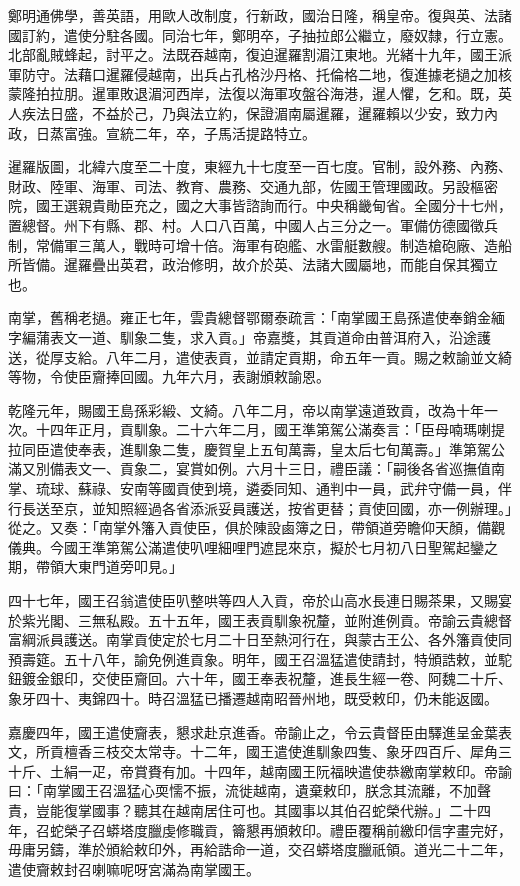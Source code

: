 \begin{pinyinscope}
鄭明通佛學，善英語，用歐人改制度，行新政，國治日隆，稱皇帝。復與英、法諸國訂約，遣使分駐各國。同治七年，鄭明卒，子抽拉郎公繼立，廢奴隸，行立憲。北部亂賊蜂起，討平之。法既吞越南，復迫暹羅割湄江東地。光緒十九年，國王派軍防守。法藉口暹羅侵越南，出兵占孔格沙丹格、托倫格二地，復進據老撾之加核蒙隆拍拉朋。暹軍敗退湄河西岸，法復以海軍攻盤谷海港，暹人懼，乞和。既，英人疾法日盛，不益於己，乃與法立約，保證湄南屬暹羅，暹羅賴以少安，致力內政，日蒸富強。宣統二年，卒，子馬活提路特立。

暹羅版圖，北緯六度至二十度，東經九十七度至一百七度。官制，設外務、內務、財政、陸軍、海軍、司法、教育、農務、交通九部，佐國王管理國政。另設樞密院，國王選親貴勛臣充之，國之大事皆諮詢而行。中央稱畿甸省。全國分十七州，置總督。州下有縣、郡、村。人口八百萬，中國人占三分之一。軍備仿德國徵兵制，常備軍三萬人，戰時可增十倍。海軍有砲艦、水雷艇數艘。制造槍砲廠、造船所皆備。暹羅疊出英君，政治修明，故介於英、法諸大國屬地，而能自保其獨立也。

南掌，舊稱老撾。雍正七年，雲貴總督鄂爾泰疏言：「南掌國王島孫遣使奉銷金緬字編蒲表文一道、馴象二隻，求入貢。」帝嘉獎，其貢道命由普洱府入，沿途護送，從厚支給。八年二月，遣使表貢，並請定貢期，命五年一貢。賜之敕諭並文綺等物，令使臣齎捧回國。九年六月，表謝頒敕諭恩。

乾隆元年，賜國王島孫彩緞、文綺。八年二月，帝以南掌遠道致貢，改為十年一次。十四年正月，貢馴象。二十六年二月，國王準第駕公滿奏言：「臣母喃瑪喇提拉同臣遣使奉表，進馴象二隻，慶賀皇上五旬萬壽，皇太后七旬萬壽。」準第駕公滿又別備表文一、貢象二，宴賞如例。六月十三日，禮臣議：「嗣後各省巡撫值南掌、琉球、蘇祿、安南等國貢使到境，遴委同知、通判中一員，武弁守備一員，伴行長送至京，並知照經過各省添派妥員護送，按省更替；貢使回國，亦一例辦理。」從之。又奏：「南掌外籓入貢使臣，俱於陳設鹵簿之日，帶領道旁瞻仰天顏，備觀儀典。今國王準第駕公滿遣使叭哩細哩門遮昆來京，擬於七月初八日聖駕起鑾之期，帶領大東門道旁叩見。」

四十七年，國王召翁遣使臣叭整哄等四人入貢，帝於山高水長連日賜茶果，又賜宴於紫光閣、三無私殿。五十五年，國王表貢馴象祝釐，並附進例貢。帝諭云貴總督富綱派員護送。南掌貢使定於七月二十日至熱河行在，與蒙古王公、各外籓貢使同預壽筵。五十八年，諭免例進貢象。明年，國王召溫猛遣使請封，特頒誥敕，並駝鈕鍍金銀印，交使臣齎回。六十年，國王奉表祝釐，進長生經一卷、阿魏二十斤、象牙四十、夷錦四十。時召溫猛已播遷越南昭晉州地，既受敕印，仍未能返國。

嘉慶四年，國王遣使齎表，懇求赴京進香。帝諭止之，令云貴督臣由驛進呈金葉表文，所貢檀香三枝交太常寺。十二年，國王遣使進馴象四隻、象牙四百斤、犀角三十斤、土絹一疋，帝賞賚有加。十四年，越南國王阮福映遣使恭繳南掌敕印。帝諭曰：「南掌國王召溫猛心耎懦不振，流徙越南，遺棄敕印，朕念其流離，不加聲責，豈能復掌國事？聽其在越南居住可也。其國事以其伯召蛇榮代辦。」二十四年，召蛇榮子召蟒塔度臘虔修職貢，籥懇再頒敕印。禮臣覆稱前繳印信字畫完好，毋庸另鑄，準於頒給敕印外，再給誥命一道，交召蟒塔度臘祇領。道光二十二年，遣使齎敕封召喇嘛呢呀宮滿為南掌國王。


\end{pinyinscope}
